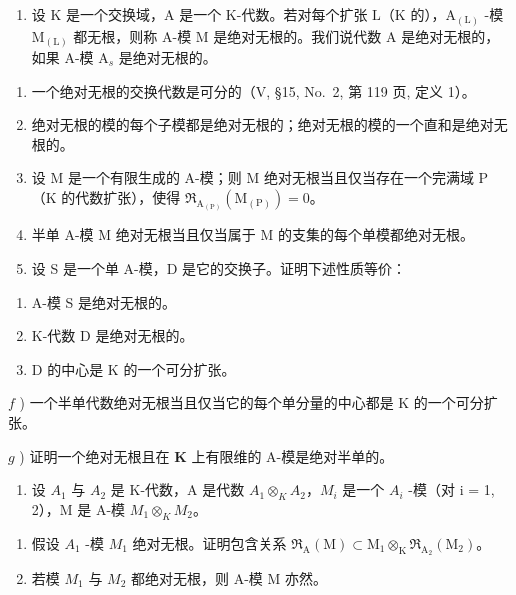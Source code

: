 
\begin{enumerate}
\def\labelenumi{\arabic{enumi})}
\tightlist
\item
  设 \(\mathrm{K}\) 是一个交换域，\(\mathrm{A}\) 是一个 K-代数。若对每个扩张 \(\mathrm{L}\)（\(\mathrm{K}\) 的），\(\mathrm{A}_{(\mathrm{L})}\) -模 \(\mathrm{M}_{(\mathrm{L})}\) 都无根，则称 A-模 M 是绝对无根的。我们说代数 \(\mathrm{A}\) 是绝对无根的，如果 A-模 \(\mathrm{A}_s\) 是绝对无根的。
\end{enumerate}

\begin{enumerate}
\def\labelenumi{\alph{enumi})}
\item
  一个绝对无根的交换代数是可分的（V, §15, No.~2, 第 119 页, 定义 1）。
\item
  绝对无根的模的每个子模都是绝对无根的；绝对无根的模的一个直和是绝对无根的。
\item
  设 M 是一个有限生成的 A-模；则 M 绝对无根当且仅当存在一个完满域 P（K 的代数扩张），使得 \(\mathfrak{R}_{\mathrm{A}_{(\mathrm{P})}}(\mathrm{M}_{(\mathrm{P})}) = 0\)。
\item
  半单 A-模 M 绝对无根当且仅当属于 M 的支集的每个单模都绝对无根。
\item
  设 S 是一个单 A-模，D 是它的交换子。证明下述性质等价：
\end{enumerate}

\begin{enumerate}
\def\labelenumi{(\roman{enumi})}
\item
  A-模 S 是绝对无根的。
\item
  K-代数 \(\mathrm{D}\) 是绝对无根的。
\item
  \(\mathrm{D}\) 的中心是 \(\mathrm{K}\) 的一个可分扩张。
\end{enumerate}

\(f\) ) 一个半单代数绝对无根当且仅当它的每个单分量的中心都是 K 的一个可分扩张。

\(g\) ) 证明一个绝对无根且在 \(\mathbf{K}\) 上有限维的 A-模是绝对半单的。

\begin{enumerate}
\def\labelenumi{\arabic{enumi})}
\setcounter{enumi}{1}
\tightlist
\item
  设 \(A_{1}\) 与 \(A_{2}\) 是 K-代数，A 是代数 \(A_{1} \otimes_{K} A_{2}\)，\(M_{i}\) 是一个 \(A_{i}\) -模（对 i = 1, 2），M 是 A-模 \(M_{1} \otimes_{K} M_{2}\)。
\end{enumerate}

\begin{enumerate}
\def\labelenumi{\alph{enumi})}
\item
  假设 \(A_{1}\) -模 \(M_{1}\) 绝对无根。证明包含关系 \(\mathfrak{R}_{\mathrm{A}}(\mathrm{M}) \subset \mathrm{M}_{1} \otimes_{\mathrm{K}} \mathfrak{R}_{\mathrm{A}_{2}}(\mathrm{M}_{2})\)。
\item
  若模 \(M_{1}\) 与 \(M_{2}\) 都绝对无根，则 A-模 M 亦然。
\end{enumerate}


